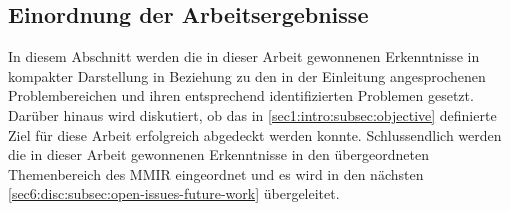 
\subsection{Einordnung der Arbeitsergebnisse}
\label{sec6:disc:subsec:categ-findings}

In diesem Abschnitt werden die in dieser Arbeit gewonnenen Erkenntnisse in kompakter Darstellung in Beziehung zu den in der Einleitung angesprochenen Problembereichen und ihren entsprechend identifizierten Problemen gesetzt.
Darüber hinaus wird diskutiert, ob das in \cref{sec1:intro:subsec:objective} definierte Ziel für diese Arbeit erfolgreich abgedeckt werden konnte.
Schlussendlich werden die in dieser Arbeit gewonnenen Erkenntnisse in den übergeordneten Themenbereich des MMIR eingeordnet und es wird in den nächsten \cref{sec6:disc:subsec:open-issues-future-work} übergeleitet.

